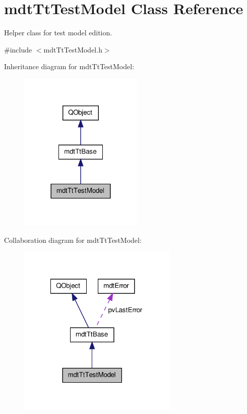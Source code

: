 \hypertarget{classmdt_tt_test_model}{\section{mdt\-Tt\-Test\-Model Class Reference}
\label{classmdt_tt_test_model}
}


Helper class for test model edition.  




{\ttfamily \#include $<$mdt\-Tt\-Test\-Model.\-h$>$}



Inheritance diagram for mdt\-Tt\-Test\-Model\-:\nopagebreak
\begin{figure}[H]
\begin{center}
\leavevmode
\includegraphics[width=168pt]{classmdt_tt_test_model__inherit__graph}
\end{center}
\end{figure}


Collaboration diagram for mdt\-Tt\-Test\-Model\-:\nopagebreak
\begin{figure}[H]
\begin{center}
\leavevmode
\includegraphics[width=216pt]{classmdt_tt_test_model__coll__graph}
\end{center}
\end{figure}
